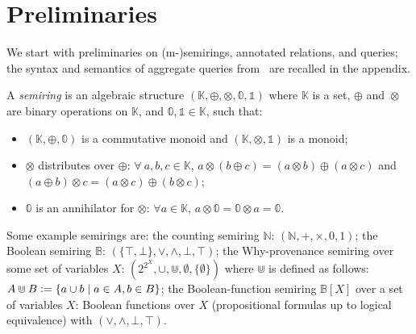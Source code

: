 \section{Preliminaries}\label{sec:preliminaries}

\begin{toappendix}
  \label{appendix}
\end{toappendix}

We start with preliminaries on (m-)semirings, annotated relations, and
queries; the syntax and semantics of aggregate queries
from~\cite{sen2026provsql} are recalled in the appendix.

\begin{definition} \label{def:semiring}
  A \emph{semiring} is an algebraic structure $(\mathbb K,\oplus,\otimes,\mathbb 0,\mathbb 1)$ where $\mathbb K$ is a set, $\oplus$ and~$\otimes$ are binary operations on $\mathbb K$, and $\mathbb 0,\mathbb 1\in \mathbb K$, such that:
  \begin{itemize}
    \item $(\mathbb K,\oplus,\mathbb 0)$ is a commutative monoid and $(\mathbb K,\otimes,\mathbb 1)$ is a monoid;
    \item $\otimes$ distributes over $\oplus$: $\forall~a,b,c\in\mathbb K$, $a\otimes (b\oplus c) = (a\otimes b)\oplus (a\otimes c)$ and $(a\oplus b)\otimes c = (a\otimes c)\oplus (b\otimes c)$;
    \item $\mathbb 0$ is an annihilator for $\otimes$: $\forall
      a\in\mathbb K$, $a\otimes \mathbb 0 = \mathbb 0 \otimes a = \mathbb 0$.
  \end{itemize}
\end{definition}

\begin{example}\label{ex:semirings}
  Some example semirings
  \cite{green2007provenance,senellart2017provenance} are:
  the counting semiring $\mathbb N$: $(\mathbb N,+,\times,0,1)$;
  the Boolean semiring $\mathbb B$:
  $(\{\top,\bot\},\lor,\land,\bot,\top)$;
  the Why-provenance semiring over some set of variables $X$:
      $(2^{2^X},\cup,\Cup,\emptyset,\{\emptyset\})$ where $\Cup$ is defined as follows: $A\Cup B \mathrel{\mathop:}= \{a\cup b \mid a\in A, b\in B\}$;
  the Boolean-function semiring $\mathbb B[X]$ over a set of variables $X$: Boolean functions
  over $X$ (propositional formulas up to logical equivalence) with
  $(\lor,\land,\bot,\top)$.
\end{example}

